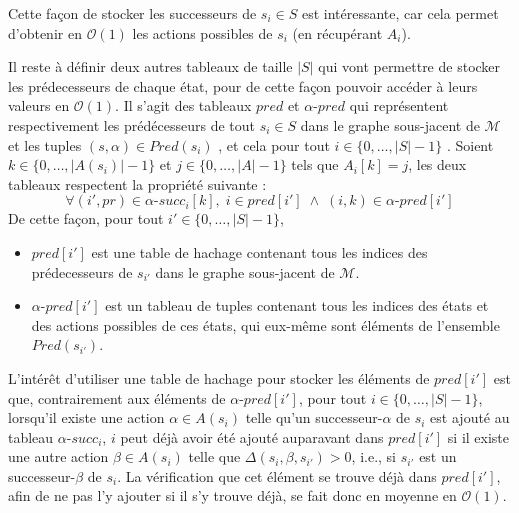 \documentclass[12pt,a4paper]{report}
\theoremstyle{definition}%
\theoremstyle{remark}
\let\labelitemi\labelitemii
\begin{document}
Cette façon de stocker les successeurs de $s_i \in S$ est intéressante, car cela
permet d'obtenir en $\mathcal{O}(1)$ les actions possibles de $s_i$
(en récupérant $A_i$). \par
Il reste à définir deux autres tableaux de taille $|S|$ qui vont permettre de
stocker les prédecesseurs de chaque état, pour de cette façon pouvoir accéder
à leurs valeurs en $\mathcal{O}(1)$.
Il s'agit des tableaux $pred$ et
$\alpha$-$pred$ qui représentent respectivement les prédécesseurs de tout $s_i \in S$
dans le graphe sous-jacent de $\mathcal{M}$ et les tuples
$(s, \alpha) \in Pred(s_i)$
, et cela pour tout $i \in \{0, \dots, |S| - 1 \}$
. Soient $k \in \{0, \dots, |A(s_i)| - 1 \}$ et
$j \in \{0, \dots, |A| - 1\}$ tels que $A_i[k] = j$, les deux tableaux respectent
la propriété suivante :
\[
	\forall (i', pr) \in \alpha\text{-}succ_i[k], \; i \in pred[i'] \; \wedge \;
	(i, k) \in \alpha\textit{-}pred[i']
\]
De cette façon, pour tout $i' \in \{0, \dots, |S| - 1 \}$,
\begin{itemize}
	\renewcommand{\labelitemi}{\tiny$\bullet$}
	\item $pred[i']$ est une table de hachage contenant tous les indices des
		prédecesseurs de $s_{i'}$ dans le graphe sous-jacent de $\mathcal{M}$.
	\item $\alpha$-$pred[i']$ est un tableau de tuples contenant tous les indices
		des états et des actions possibles de ces états, qui eux-même sont éléments
		de l'ensemble $Pred(s_{i'})$.
\end{itemize}
L'intérêt d'utiliser une table de hachage pour stocker les éléments de
$pred[i']$ est que, contrairement aux éléments de $\alpha$-$pred[i']$, pour tout $i \in \{0, \dots, |S| - 1 \}$, lorsqu'il existe une action $\alpha \in A(s_i)$ telle qu'un
successeur-$\alpha$ de $s_i$ est
ajouté au tableau $\alpha$-$succ_i$, $i$ peut déjà avoir été ajouté auparavant
dans $pred[i']$ si il existe une autre action $\beta \in A(s_i)$ telle que $\Delta(s_i, \beta, s_{i'}) > 0$, i.e., si $s_{i'}$ est un successeur-$\beta$ de $s_i$. La vérification que cet élément se trouve déjà dans $pred[i']$, afin de ne pas l'y ajouter si il s'y trouve déjà,
se fait donc en moyenne en $\mathcal{O}(1)$.\\
\end{document}
